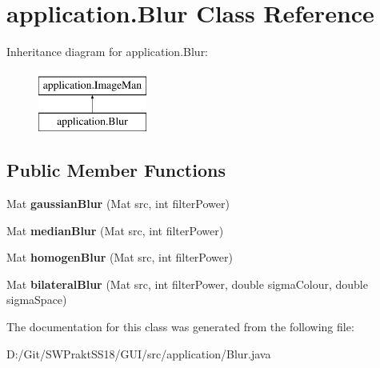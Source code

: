 \hypertarget{classapplication_1_1_blur}{}\section{application.\+Blur Class Reference}
\label{classapplication_1_1_blur}
Inheritance diagram for application.\+Blur\+:\begin{figure}[H]
\begin{center}
\leavevmode
\includegraphics[height=2.000000cm]{classapplication_1_1_blur}
\end{center}
\end{figure}
\subsection*{Public Member Functions}
\begin{DoxyCompactItemize}
\item 
\mbox{\label{classapplication_1_1_blur_a445cba49c071e6a84b9ae6d56f208f60}} 
Mat {\bfseries gaussian\+Blur} (Mat src, int filter\+Power)
\item 
\mbox{\label{classapplication_1_1_blur_a070e2c5803f62149b71ae9bc867a44da}} 
Mat {\bfseries median\+Blur} (Mat src, int filter\+Power)
\item 
\mbox{\label{classapplication_1_1_blur_aa26cb7151a1acda73884d3fb9479e971}} 
Mat {\bfseries homogen\+Blur} (Mat src, int filter\+Power)
\item 
\mbox{\label{classapplication_1_1_blur_af85191ef064d33c47886bc17d6af9ebe}} 
Mat {\bfseries bilateral\+Blur} (Mat src, int filter\+Power, double sigma\+Colour, double sigma\+Space)
\end{DoxyCompactItemize}


The documentation for this class was generated from the following file\+:\begin{DoxyCompactItemize}
\item 
D\+:/\+Git/\+S\+W\+Prakt\+S\+S18/\+G\+U\+I/src/application/Blur.\+java\end{DoxyCompactItemize}
